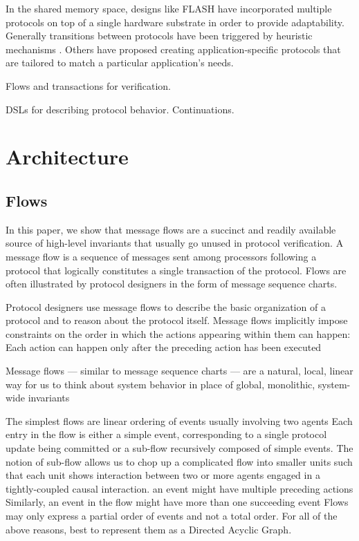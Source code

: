 In the shared memory space, designs like FLASH \cite{kuskin-archnews94} have incorporated multiple protocols on top of a single hardware substrate in order to provide adaptability. Generally transitions between protocols have been triggered by heuristic mechanisms \cite{mukherjee-archnews98}. Others \cite{chandra-sigplan96,falsafi-sc94} have proposed creating application-specific protocols that are tailored to match a particular application's needs.

Flows and transactions for verification.

DSLs for describing protocol behavior. Continuations.


\section{Architecture} 

\subsection{Flows}

In this paper, we show that message flows are a succinct and
readily available source of high-level invariants that usually go
unused in protocol verification. A message flow is a sequence
of messages sent among processors following a protocol that
logically constitutes a single transaction of the protocol. Flows
are often illustrated by protocol designers in the form of
message sequence charts.

Protocol designers use message flows to describe
the basic organization of a protocol and to reason about the
protocol itself.
Message flows implicitly impose constraints
on the order in which the actions appearing within them can happen:
Each action can happen only after the preceding action has been executed

Message flows — similar to message sequence charts — are a natural,
local, linear way for us to think about system behavior in place
of global, monolithic, system-wide invariants

The simplest flows are linear ordering of events usually involving two agents
Each entry in the flow is either a simple event, 
corresponding to a single protocol update being committed or a sub-flow recursively composed of simple events.
The notion of sub-flow allows us to
chop up a complicated flow into smaller units such that each
unit shows interaction between two or more agents engaged in a tightly-coupled causal interaction.
an event might have multiple preceding actions
Similarly, an event in the flow might have more than one succeeding event
Flows may only express a partial order of events and not a total order.
For all of the above reasons, best to represent them as a Directed Acyclic Graph.

